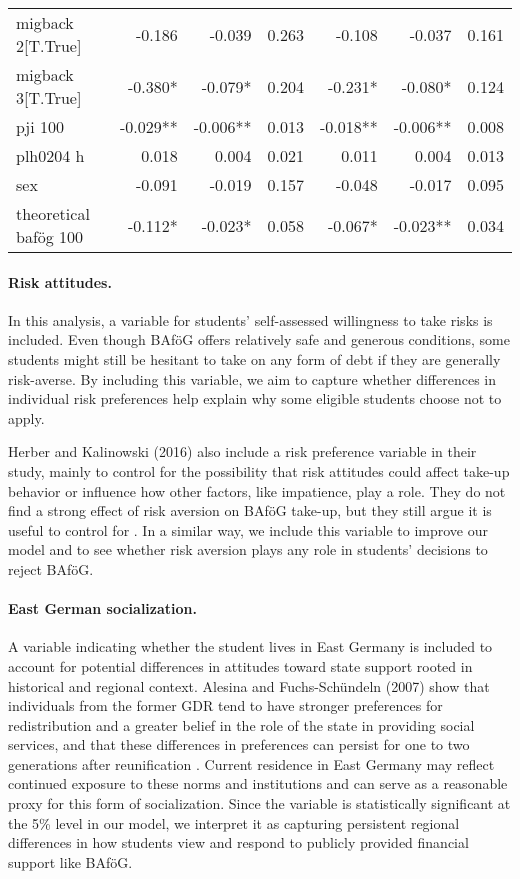 \begin{table}[htbp]
\begin{tabular}{lrrrrrr}
migback 2[T.True]       & -0.186    & -0.039     & 0.263     & -0.108    & -0.037     & 0.161     \\
migback 3[T.True]       & -0.380*   & -0.079*    & 0.204     & -0.231*   & -0.080*    & 0.124     \\
pji 100                 & -0.029**  & -0.006**   & 0.013     & -0.018**  & -0.006**   & 0.008     \\
plh0204 h               & 0.018     & 0.004      & 0.021     & 0.011     & 0.004      & 0.013     \\
sex                     & -0.091    & -0.019     & 0.157     & -0.048    & -0.017     & 0.095     \\
theoretical bafög 100   & -0.112*   & -0.023*    & 0.058     & -0.067*   & -0.023**   & 0.034     \\
\bottomrule
\end{tabular}
\end{table}


\paragraph{Risk attitudes.} In this analysis, a variable for students' self-assessed willingness to take risks is included. Even though BAföG offers relatively safe and generous conditions, some students might still be hesitant to take on any form of debt if they are generally risk-averse. By including this variable, we aim to capture whether differences in individual risk preferences help explain why some eligible students choose not to apply.

Herber and Kalinowski (2016) also include a risk preference variable in their study, mainly to control for the possibility that risk attitudes could affect take-up behavior or influence how other factors, like impatience, play a role. They do not find a strong effect of risk aversion on BAföG take-up, but they still argue it is useful to control for \citep{herber_non-take-up_2019}. In a similar way, we include this variable to improve our model and to see whether risk aversion plays any role in students’ decisions to reject BAföG.

\paragraph{East German socialization.}  A variable indicating whether the student lives in East Germany is included to account for potential differences in attitudes toward state support rooted in historical and regional context. Alesina and Fuchs-Schündeln (2007) show that individuals from the former GDR tend to have stronger preferences for redistribution and a greater belief in the role of the state in providing social services, and that these differences in preferences can persist for one to two generations after reunification \citep{alesina_good-bye_2007}. Current residence in East Germany may reflect continued exposure to these norms and institutions and can serve as a reasonable proxy for this form of socialization. Since the variable is statistically significant at the 5\% level in our model, we interpret it as capturing persistent regional differences in how students view and respond to publicly provided financial support like BAföG.
